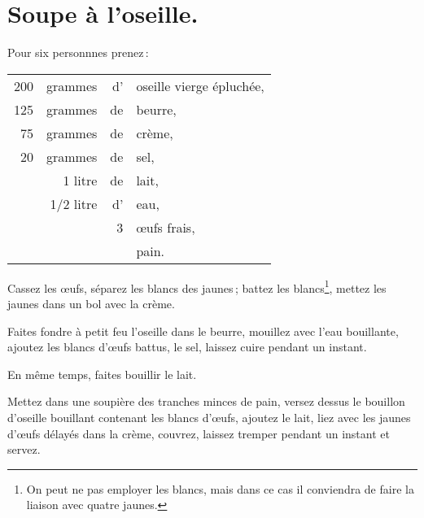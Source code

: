 \section*{\centering Soupe à l’oseille.}

Pour six personnnes prenez :

\medskip

\footnotesize
\begin{longtable}{rrrp{16em}}                                                    
    200 & grammes   & d' & oseille vierge épluchée,                                                       \\
    125 & grammes   & de & beurre,                                                                        \\
     75 & grammes   & de & crème,                                                                         \\
     20 & grammes   & de & sel,                                                                           \\
        &   1 litre & de & lait,                                                                          \\
        & 1/2 litre & d' & eau,                                                                           \\
        &           &  3 & œufs frais,                                                                    \\
        &           &    & pain.                                                                          \\
\end{longtable}
\normalsize                                      

Cassez les œufs, séparez les blancs des jaunes ; battez les blancs\footnote{On
peut ne pas employer les blancs, mais dans ce cas il conviendra de faire la
liaison avec quatre jaunes.}, mettez les jaunes dans un bol avec la crème.

Faites fondre à petit feu l'oseille dans le beurre, mouillez avec l'eau bouillante,
ajoutez les blancs d'œufs battus, le sel, laissez cuire pendant un instant.

En même temps, faites bouillir le lait.

Mettez dans une soupière des tranches minces de pain, versez dessus le bouillon
d'oseille bouillant contenant les blancs d'œufs, ajoutez le lait, liez avec les
jaunes d'œufs délayés dans la crème, couvrez, laissez tremper pendant un
instant et servez.

